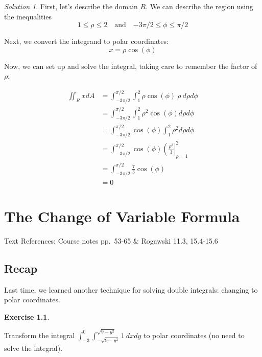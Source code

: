 \documentclass[
]{book}
\theoremstyle{definition}
\theoremstyle{definition}
\theoremstyle{definition}
\newtheorem{exercise}{Exercise}[chapter]
\theoremstyle{definition}
\theoremstyle{remark}
\newtheorem*{solution}{Solution}
\begin{document}
\begin{solution}

First, let's describe the domain \(R\). We can describe the region using the inequalities \[1\leq \rho\leq 2 \quad\mbox{and}\quad {- 3\pi/2}\leq \phi\leq \pi/2\]

Next, we convert the integrand to polar coordinates: \[x =\rho\cos(\phi)\]

Now, we can set up and solve the integral, taking care to remember the factor of \(\rho\):

\begin{align*}
\displaystyle \iint_R x dA &= \int_{-3\pi/2}^{\pi/2}\int_1^2 \rho\cos(\phi)~\rho~d\rho d\phi \\
&= \int_{-3\pi/2}^{\pi/2}\int_1^2 \rho^2 \cos(\phi) d\rho d\phi\\
&= \int_{-3\pi/2}^{\pi/2}\cos(\phi) \int_1^2 \rho^2 d\rho d\phi \\
&= \int_{-3\pi/2}^{\pi/2}\cos(\phi) \left (\frac{\rho^3}{3}\right |_{\rho=1}^2\\
& = \int_{-3\pi/2}^{\pi/2} \frac{7}{3}\cos(\phi)\\
&= 0
\end{align*}

\end{solution}

\hypertarget{lec-13}{%
\chapter{The Change of Variable Formula}\label{lec-13}}

Text References: Course notes pp.~53-65 \& Rogawski 11.3, 15.4-15.6

\hypertarget{recap-11}{%
\section{Recap}\label{recap-11}}

Last time, we learned another technique for solving double integrals: changing to polar coordinates.

\begin{exercise}
\protect\hypertarget{exr:unlabeled-div-95}{}\label{exr:unlabeled-div-95}

Transform the integral \(\displaystyle \int_{-3}^0\int_{-\sqrt{9-y^2}}^{\sqrt{9-y^2}} 1~dxdy\) to polar coordinates (no need to solve the integral).

\end{exercise}
\end{document}
